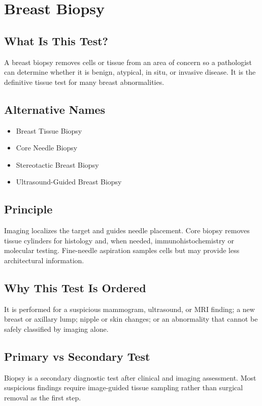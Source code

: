 \chapter{Breast Biopsy}

\section*{What Is This Test?}
A breast biopsy removes cells or tissue from an area of concern so a pathologist can determine whether it is benign, atypical, in situ, or invasive disease. It is the definitive tissue test for many breast abnormalities.

\section*{Alternative Names}
\begin{itemize}
  \item Breast Tissue Biopsy
  \item Core Needle Biopsy
  \item Stereotactic Breast Biopsy
  \item Ultrasound-Guided Breast Biopsy
\end{itemize}

\section*{Principle}
Imaging localizes the target and guides needle placement. Core biopsy removes tissue cylinders for histology and, when needed, immunohistochemistry or molecular testing. Fine-needle aspiration samples cells but may provide less architectural information.

\section*{Why This Test Is Ordered}
It is performed for a suspicious mammogram, ultrasound, or MRI finding; a new breast or axillary lump; nipple or skin changes; or an abnormality that cannot be safely classified by imaging alone.

\section*{Primary vs Secondary Test}
Biopsy is a secondary diagnostic test after clinical and imaging assessment. Most suspicious findings require image-guided tissue sampling rather than surgical removal as the first step.

